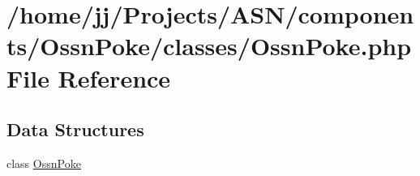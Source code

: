 \hypertarget{_ossn_poke_8php}{}\section{/home/jj/\+Projects/\+A\+S\+N/components/\+Ossn\+Poke/classes/\+Ossn\+Poke.php File Reference}
\label{_ossn_poke_8php}
\subsection*{Data Structures}
\begin{DoxyCompactItemize}
\item 
class \hyperlink{class_ossn_poke}{Ossn\+Poke}
\end{DoxyCompactItemize}
